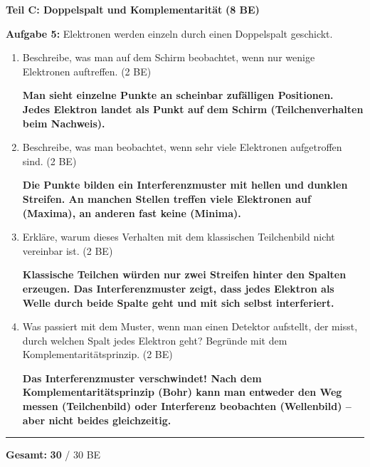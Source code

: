 \documentclass[11pt,a4paper]{article}
\newcommand{\lsg}[1]{\textcolor{loesung}{\textbf{#1}}}
\begin{document}
\vspace{0.5em}


{\large\textbf{Teil C: Doppelspalt und Komplementarität}} \hfill \textbf{(8 BE)}

\vspace{0.3em}

\textbf{Aufgabe 5:} Elektronen werden einzeln durch einen Doppelspalt geschickt.

\begin{enumerate}[label=\alph*)]
\item Beschreibe, was man auf dem Schirm beobachtet, wenn nur wenige Elektronen auftreffen. \hfill (2 BE)

\lsg{Man sieht einzelne Punkte an scheinbar zufälligen Positionen. Jedes Elektron landet als Punkt auf dem Schirm (Teilchenverhalten beim Nachweis).}

\vspace{0.3em}

\item Beschreibe, was man beobachtet, wenn sehr viele Elektronen aufgetroffen sind. \hfill (2 BE)

\lsg{Die Punkte bilden ein Interferenzmuster mit hellen und dunklen Streifen. An manchen Stellen treffen viele Elektronen auf (Maxima), an anderen fast keine (Minima).}

\vspace{0.3em}

\item Erkläre, warum dieses Verhalten mit dem klassischen Teilchenbild nicht vereinbar ist. \hfill (2 BE)

\lsg{Klassische Teilchen würden nur zwei Streifen hinter den Spalten erzeugen. Das Interferenzmuster zeigt, dass jedes Elektron als Welle durch beide Spalte geht und mit sich selbst interferiert.}

\vspace{0.3em}

\item Was passiert mit dem Muster, wenn man einen Detektor aufstellt, der misst, durch welchen Spalt jedes Elektron geht? Begründe mit dem Komplementaritätsprinzip. \hfill (2 BE)

\lsg{Das Interferenzmuster verschwindet! Nach dem Komplementaritätsprinzip (Bohr) kann man entweder den Weg messen (Teilchenbild) oder Interferenz beobachten (Wellenbild) -- aber nicht beides gleichzeitig.}

\end{enumerate}

\begin{center}
\rule{10cm}{0.5pt}

\textbf{Gesamt:} \lsg{30} / 30 BE
\end{center}
\end{document}
